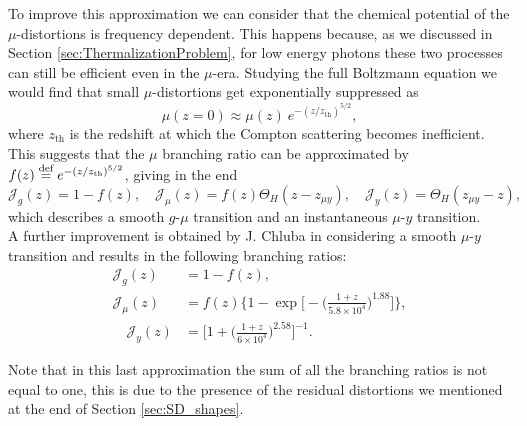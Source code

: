 To improve this approximation we can consider that the chemical potential of the $\mu$-distortions is frequency dependent. This happens because, as we discussed in Section \ref{sec:ThermalizationProblem}, for low energy photons these two processes can still be efficient even in the $\mu$-era. Studying the full Boltzmann equation we would find that small $\mu$-distortions get exponentially suppressed as \cite{Danese_82} 
\begin{equation}
    \label{eq:SD_mu_freq}
    \mu(z=0)\approx\mu(z)\ e^{-(z/z_{\text{th}})^{5/2}},
\end{equation}
where $z_{\text{th}}$ is the redshift at which the Compton scattering becomes inefficient. This suggests that the $\mu$ branching ratio can be approximated by $f(z)\stackrel{\text{def}}{=} e^{-(z/z_{\text{th}})^{5/2}}$, giving in the end
\begin{equation}
    \mathcal{J}_g(z)=1-f(z),\quad \mathcal{J}_\mu(z)=f(z)\Theta_{H}(z-z_{\mu y}),\quad \mathcal{J}_y(z)=\Theta_{H}(z_{\mu y}-z), \label{eq:BR_soft}
\end{equation}
which describes a smooth $g$-$\mu$ transition and an instantaneous $\mu$-$ y$ transition.\\A further improvement is obtained by J. Chluba in \cite{Chluba_Green} considering a smooth $\mu$-$ y$ transition and results in the following branching ratios:
\begin{subequations}\label{eq:BR_soft_soft}
 \begin{align}
    \mathcal{J}_g(z)&=1-f(z),\\ \mathcal{J}_\mu(z)&=f(z)\Bigg\{1-\exp\Bigg[-\bigg(\frac{1+z}{5.8\times10^4}\bigg)^{1.88}\Bigg]\Bigg\},\\\quad \mathcal{J}_y(z)&=\Bigg[1+\bigg(\frac{1+z}{6\times10^{4}}\bigg)^{2.58}\Bigg]^{-1}.
\end{align}   
\end{subequations}

Note that in this last approximation the sum of all the branching ratios is not equal to one, this is due to the presence of the residual distortions we mentioned at the end of Section \ref{sec:SD_shapes}. 

